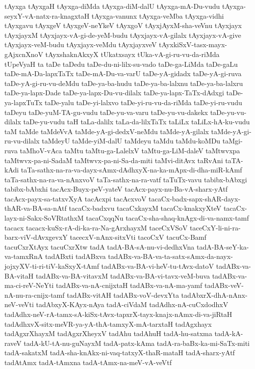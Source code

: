 {tAyxga
tAyxgaH
tAyxga-diMda
tAyxga-diM-dalU
tAyxga-mA-Du-vudu
tAyxga-seyxY-vA-natx-ra-knagxtaH
tAyxga-vanunx
tAyxga-veMba
tAyxga-vidhi
tAyxgavu
tAyxgeV
tAyxgeV-neYkeV
tAyxgoV
tAyxjAyxM-sha-veVnu
tAyxjayx
tAyxjayxM
tAyxjayx-vA-gi-de-yeM-budu
tAyxjayx-vA-gilalx
tAyxjayx-vA-give
tAyxjayx-veM-budu
tAyxjayx-veMdu
tAyxjayxveV
tAyxkiSxV-tasx-mayx-gAjxcnXnoV
tAyxshaknAkxyX
tUkatxsayx
tUka-vA-gi-ru-vu-da-riMda
tUpeVyaH
ta
taDe
taDedu
taDe-du-ni-lilx-su-vado
taDe-ga-LiMda
taDe-gaLu
taDe-mA-Da-lapxTaTx
taDe-mA-Du-va-varU
taDe-yA-gidadx
taDe-yA-gi-ruva
taDe-yA-gi-ru-vu-deMdu
taDe-ya-ba-hudu
taDe-ya-ba-lalxnu
taDe-ya-ba-lalxru
taDe-ya-lapx-Dade
taDe-ya-lapx-Du-vu-dilalx
taDe-ya-lapx-TaTx-dAdxgi
taDe-ya-lapxTuTx
taDe-yalu
taDe-yi-lalxvo
taDe-yi-ru-vu-da-riMda
taDe-yi-ru-vudu
taDeyu
taDe-yuM-TA-gu-vudu
taDe-yu-va-varu
taDe-yu-vu-dakekx
taDe-yu-vu-dilalx
taDe-yu-vudu
taH
taLa-dalilx
taLa-da-lilxTaTx
taLiLx
taLiLx-hA-ku-vudu
taM
taMde
taMdeVvA
taMde-yA-gi-dedxV-neMdu
taMde-yA-gilalx
taMde-yA-gi-ru-vu-dilalx
taMdeyU
taMde-yiM-dalU
taMdeyu
taMdu
taMdu-koMDu
taMgi-ruva
taMhoV-vAca
taMtu
taMtu-ga-LalelxV
taMtu-ga-LiM-daleV
taMtwvxpa
taMtwvx-pa-ni-SadaM
taMtwvx-pa-ni-Sa-da-miti
taMvi-ditAvx
taRvAni
taTA-kAdi
taTa-sathx-na-ra-va-dayx-sAmx-dAdhxyX-na-ka-mApx-di-dha-miR-kAmf
taTa-sathx-na-ra-va-nAnxvoV
taTa-sathx-na-ra-vatf
taTuTx-vavu
tabibx-bAbxgi
tabibx-bAbxhi
tacAcx-Buyx-peV-yateV
tacAcx-payx-nu-Ba-vA-sharx-yAtf
tacAcx-payx-sa-tatxvXyA
tacAcxpi
tacAcxvoV
tacaCx-badx-sapx-shAR-dayx-thAR-va-BA-sa-nAtf
tacaCx-badxvu
tacaCxkayxM
tacaCx-knakxyXteV
tacaCx-layx-ni-Sakx-SoVRtathxM
tacaCxqqNu
tacaCx-sha-shaq-knAgx-di-va-namx-tamf
tacacx
tacacx-kuSx-rA-di-ka-ra-Na-gArxhayxM
taceCxVSoV
taceCxY-li-ni-ra-barx-viV-dAvxgevxY
tacecxV-nAnx-sitxVti
tacoCxV
tacuCx-Bamf
tacuCxrXtAyx
tacuCxrXtw
tadA
tadA-BA-sA-nu-vi-dedhxVna
tadA-BA-seY-ka-va-tamxRnA
tadABxti
tadABxva
tadABx-va-BA-va-ta-satx-sAmx-da-nayx-jojxyXV-ti-ri-tiV-kaSxyX-tAmf
tadABx-va-BA-vi-heV-tu-tAvx-datoV
tadABx-va-BA-vitaH
tadABx-va-BA-vitavxM
tadABx-va-BA-vi-tavx-veM-buva
tadABx-va-ma-ci-reV-NeYti
tadABx-va-nA-cnijxtaH
tadABx-va-nA-ma-yamf
tadABx-veV-nA-nu-ra-cnijx-tamf
tadABx-vitAH
tadABx-voV-devxYta
tadAbxrX-dhA-nAnx-neV-veVti
tadAbxyX-KAyx-nAya
tadA-ciVdaM
tadAdhx-nA-cuCxdodhxV
tadAdhx-neV-rA-tamx-sA-kiSx-tAvx-tapxrX-tayx-knajx-nAmx-di-va-jiRtaH
tadAdhxvX-sitx-meVR-ya-yA-thA-tamxyX-mA-tarxtaH
tadAgxhayx
tadAgxrXhayxM
tadAgxrXheyxV
tadAhu
tadAhuH
tadA-hu-satxma
tadA-kA-raveV
tadA-kU-tA-nu-guNayxM
tadA-patx-kAma
tadA-ra-baBx-ka-mi-SaTx-miti
tadA-sakatxM
tadA-sha-knAkx-ni-vaq-tatxyX-thaR-mataH
tadA-sharx-yAtf
tadAtAmx
tadA-tAmxna
tadA-tAmx-na-meV-vA-veVtf
}
